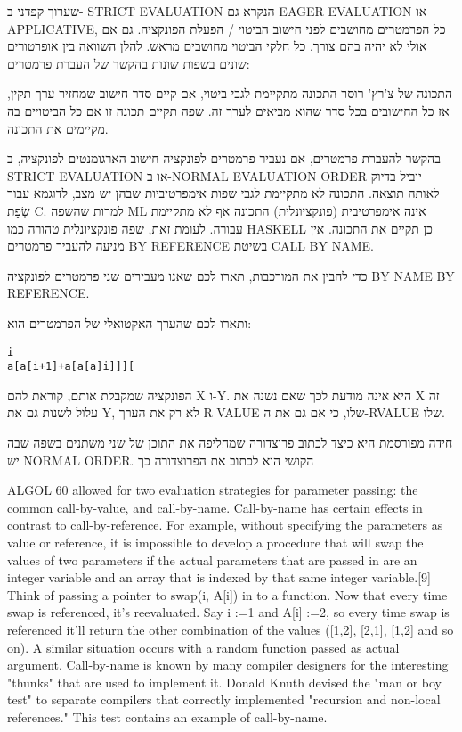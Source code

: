        שערוך קפדני
        ב- STRICT EVALUATION הנקרא גם EAGER EVALUATION או APPLICATIVE, כל הפרמטרים מחושבים לפני חישוב הביטוי / הפעלת הפונקציה. גם אם אולי לא יהיה בהם צורך, כל חלקי הביטוי מחושבים מראש.
        להלן השוואה בין אופרטורים שונים בשפות שונות בהקשר של העברת פרמטרים:

        התכונה של צ'רץ' רוסר
        התכונה מתקיימת לגבי ביטוי, אם קיים סדר חישוב שמחזיר ערך תקין, אז כל החישובים
        בכל סדר שהוא מביאים לערך זה. שפה תקיים תכונה זו אם כל הביטויים בה מקיימים את
        התכונה.

        בהקשר להעברת פרמטרים, אם נעביר פרמטרים לפונקציה חישוב הארגומנטים לפונקציה, ב
        STRICT EVALUATION או ב-NORMAL EVALUATION ORDER יוביל בדיוק לאותה תוצאה. התכונה
        לא מתקיימת לגבי שפות אימפרטיביות שבהן יש מצב, לדוגמא עבור שְׂפַת C. למרות שהשפה
        ML אינה אימפרטיבית (פונקציונלית) התכונה אף לא מתקיימת עבורה. לעומת זאת, שפה
        פונקציונלית טהורה כמו HASKELL כן תקיים את התכונה. אין מניעה להעביר פרמטרים BY
        REFERENCE בשיטת CALL BY NAME.

        כדי להבין את המורכבות, תארו לכם שאנו מעבירים שני פרמטרים לפונקציה BY NAME BY
        REFERENCE.

        ותארו לכם שהערך האקטואלי של הפרמטרים הוא:

\begin{verbatim}
i
a[a[i+1]+a[a[a]i]]][
\end{verbatim}

        הפונקציה שמקבלת אותם, קוראת להם X ו-Y. היא אינה מודעת לכך שאם נשנה את X זה עלול לשנות גם את Y, לא רק את הערך R VALUE שלו, כי אם גם את ה-RVALUE שלו.

        חידה מפורסמת היא כיצד לכתוב פרוצדורה שמחליפה את התוכן של שני משתנים בשפה שבה יש NORMAL ORDER. הקושי הוא לכתוב את הפרוצדורה כך

        ALGOL 60 allowed for two evaluation strategies for parameter passing: the common call-by-value, and call-by-name. Call-by-name has certain effects in contrast to call-by-reference. For example, without specifying the parameters as value or reference, it is impossible to develop a procedure that will swap the values of two parameters if the actual parameters that are passed in are an integer variable and an array that is indexed by that same integer variable.[9] Think of passing a pointer to swap(i, A[i]) in to a function. Now that every time swap is referenced, it's reevaluated. Say i :=1 and A[i] :=2, so every time swap is referenced it'll return the other combination of the values ([1,2], [2,1], [1,2] and so on). A similar situation occurs with a random function passed as actual argument.
        Call-by-name is known by many compiler designers for the interesting "thunks" that are used to implement it. Donald Knuth devised the "man or boy test" to separate compilers that correctly implemented "recursion and non-local references." This test contains an example of call-by-name.

